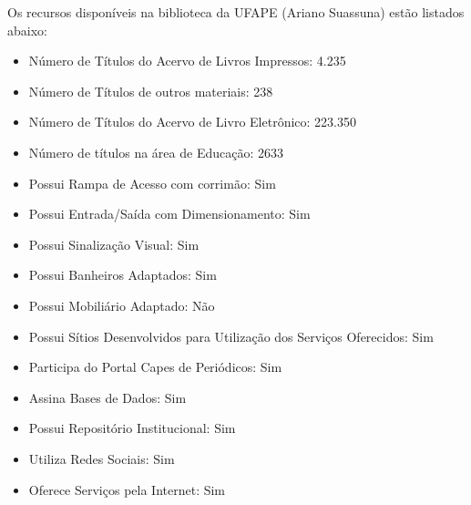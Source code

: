 \documentclass[
	12pt,				%
	openright,			%
  oneside,     %
	a4paper,			%
 hyphens,
	chapter=TITLE,		%
	english,			%
	french,				%
	spanish,			%
	brazil				%
	]{abntex2}
\begin{document}
Os recursos disponíveis na biblioteca da UFAPE (Ariano Suassuna) estão listados abaixo:
\begin{itemize}
    \item Número de Títulos do Acervo de Livros Impressos: 4.235
    \item Número de Títulos de outros materiais: 238
    \item Número de Títulos do Acervo de Livro Eletrônico: 223.350
    \item Número de títulos na área de Educação: 2633
    \item Possui Rampa de Acesso com corrimão: Sim
    \item Possui Entrada/Saída com Dimensionamento: Sim
    \item Possui Sinalização Visual: Sim
    \item Possui Banheiros Adaptados: Sim
    \item Possui Mobiliário Adaptado: Não
    \item Possui Sítios Desenvolvidos para Utilização dos Serviços Oferecidos: Sim
    \item Participa do Portal Capes de Periódicos: Sim
    \item Assina Bases de Dados: Sim
    \item Possui Repositório Institucional: Sim
    \item Utiliza Redes Sociais: Sim
    \item Oferece Serviços pela Internet: Sim
\end{itemize}


\end{document}
